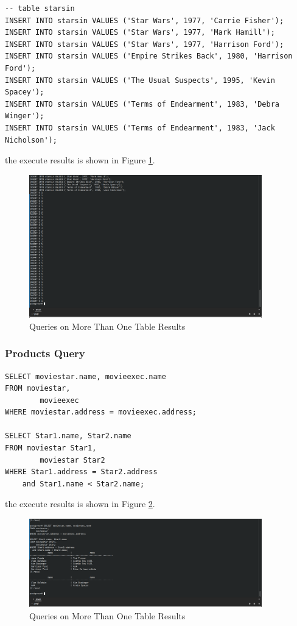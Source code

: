 \documentclass{cshwk}
\begin{document}
\begin{lstlisting}
-- table starsin
INSERT INTO starsin VALUES ('Star Wars', 1977, 'Carrie Fisher');
INSERT INTO starsin VALUES ('Star Wars', 1977, 'Mark Hamill');
INSERT INTO starsin VALUES ('Star Wars', 1977, 'Harrison Ford');
INSERT INTO starsin VALUES ('Empire Strikes Back', 1980, 'Harrison Ford');
INSERT INTO starsin VALUES ('The Usual Suspects', 1995, 'Kevin Spacey');
INSERT INTO starsin VALUES ('Terms of Endearment', 1983, 'Debra Winger');
INSERT INTO starsin VALUES ('Terms of Endearment', 1983, 'Jack Nicholson');
\end{lstlisting}

the execute results is shown in Figure \ref{fig:more-than-one-table-2}.
\begin{figure}[htbp]
    \centering
    \includegraphics[width=0.9\textwidth]{hw4-10.png}
    \caption{Queries on More Than One Table Results}
    \label{fig:more-than-one-table-2}
\end{figure}

\subsubsection{Products Query}

\begin{lstlisting}
SELECT moviestar.name, movieexec.name
FROM moviestar,
        movieexec
WHERE moviestar.address = movieexec.address;

SELECT Star1.name, Star2.name
FROM moviestar Star1,
        moviestar Star2
WHERE Star1.address = Star2.address
    and Star1.name < Star2.name;
\end{lstlisting}

the execute results is shown in Figure \ref{fig:products-query}.

\begin{figure}[htbp]
    \centering
    \includegraphics[width=0.9\textwidth]{hw4-11.png}
    \caption{Queries on More Than One Table Results}
    \label{fig:products-query}
\end{figure}
\end{document}
